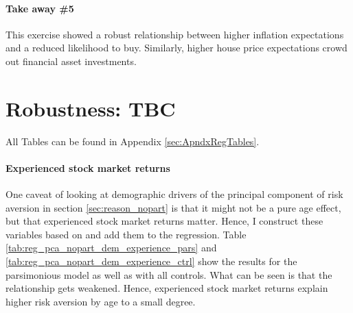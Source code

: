 \documentclass[ProjectABM]{subfiles}
\begin{document}




\paragraph{Take away \#5}
This exercise showed a robust relationship between higher inflation expectations and a reduced likelihood to buy. Similarly, higher house price expectations crowd out financial asset investments.

\section{Robustness: TBC}\label{sec:robustness}
All Tables can be found in Appendix \ref{sec:ApndxRegTables}.

\paragraph{Experienced stock market returns}
One caveat of looking at demographic drivers of the principal component of risk aversion in section \ref{sec:reason_nopart} is that it might not be a pure age effect, but that experienced stock market returns matter. Hence, I construct these variables based on \cite{malmendier_2011} and add them to the regression.
Table \ref{tab:reg_pca_nopart_dem_experience_pars} and \ref{tab:reg_pca_nopart_dem_experience_ctrl} show the results for the parsimonious model as well as with all controls. What can be seen is that the relationship gets weakened. Hence, experienced stock market returns explain higher risk aversion by age to a small degree.
\end{document}
